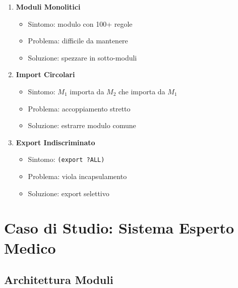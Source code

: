 \begin{warningbox}
\begin{enumerate}
\item \textbf{Moduli Monolitici}
   \begin{itemize}
   \item Sintomo: modulo con 100+ regole
   \item Problema: difficile da mantenere
   \item Soluzione: spezzare in sotto-moduli
   \end{itemize}

\item \textbf{Import Circolari}
   \begin{itemize}
   \item Sintomo: $M_1$ importa da $M_2$ che importa da $M_1$
   \item Problema: accoppiamento stretto
   \item Soluzione: estrarre modulo comune
   \end{itemize}

\item \textbf{Export Indiscriminato}
   \begin{itemize}
   \item Sintomo: \texttt{(export ?ALL)}
   \item Problema: viola incapsulamento
   \item Soluzione: export selettivo
   \end{itemize}
\end{enumerate}
\end{warningbox}

\section{Caso di Studio: Sistema Esperto Medico}

\subsection{Architettura Moduli}

